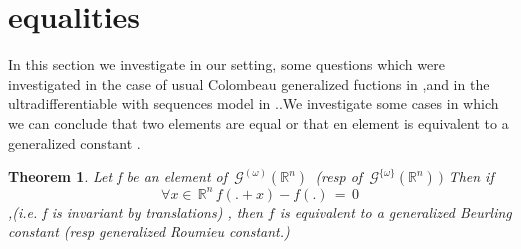\documentclass[12pt,a4paper]{amsart}
\newcommand{\RR}{\mathbb R}
\newtheorem{theorem}{Theorem}[section]
\begin{document}
\section{equalities}


In this section we investigate in our setting, some questions which were investigated in the case of usual Colombeau generalized fuctions in 
 \cite{P.S.V.} ,and in the ultradifferentiable with sequences model in  \cite{P.R.S.Z}..We investigate  some  cases in which we can conclude that two elements are equal or that en element is equivalent  to a generalized constant .

\begin{theorem}
Let f be an element of
 $\, \mathcal{G}^{(\omega)}(\RR^n)\,$
(resp of $\,\mathcal{G}^{\{\omega\}}(\RR^n)\,)$ 
Then if 
$$\forall x\in\,\RR^n\,f(.+x) -f(.) \,
=\,0 
$$ ,(i.e. f is invariant by translations) , then $f$ is equivalent to a generalized Beurling constant (resp generalized Roumieu constant.)
 \end{theorem}
\end{document}
